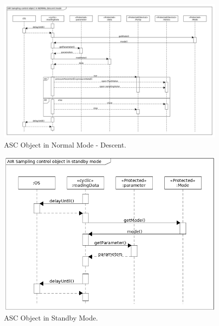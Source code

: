 \documentclass[a4paper,12pt,oneside]{article}
\begin{document}
\begin{appendices}
\begin{landscape}
\begin{figure}[H]
    \centering
    \includegraphics[height=0.9\textwidth]{appendix/img/softwareDiagrams/ASC-seq-dia-v1-3-descent.jpg}
    \caption{ASC Object in Normal Mode - Descent.}
    \label{ASCb}
\end{figure}
\begin{figure}[H]
    \centering
    \includegraphics[height=0.9\textwidth]{appendix/img/ASC-seq-dia-v1-2-c.png}
    \caption{ASC Object in Standby Mode.}
    \label{ASCb}
\end{figure}

\end{landscape}
\end{appendices}
\end{document}
